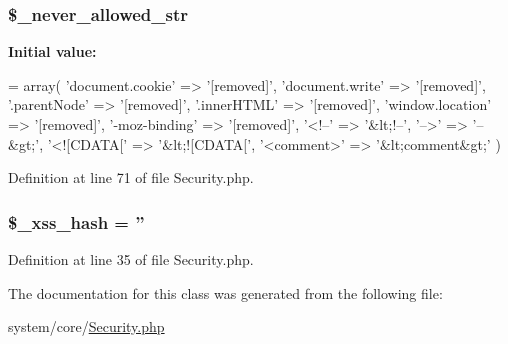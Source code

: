 \hypertarget{class_c_i___security_ab883fab930a1c4a926eaa501ab211823}{
\subsubsection[{\$\-\_\-never\-\_\-allowed\-\_\-str}]{\setlength{\rightskip}{0pt plus 5cm}\$\-\_\-never\-\_\-allowed\-\_\-str\hspace{0.3cm}{\ttfamily [protected]}}}\label{class_c_i___security_ab883fab930a1c4a926eaa501ab211823}
{\bfseries Initial value\-:}
\begin{DoxyCode}
= array(
        \textcolor{stringliteral}{'document.cookie'}   => \textcolor{stringliteral}{'[removed]'},
        \textcolor{stringliteral}{'document.write'}    => \textcolor{stringliteral}{'[removed]'},
        \textcolor{stringliteral}{'.parentNode'}       => \textcolor{stringliteral}{'[removed]'},
        \textcolor{stringliteral}{'.innerHTML'}        => \textcolor{stringliteral}{'[removed]'},
        \textcolor{stringliteral}{'window.location'}   => \textcolor{stringliteral}{'[removed]'},
        \textcolor{stringliteral}{'-moz-binding'}      => \textcolor{stringliteral}{'[removed]'},
        \textcolor{stringliteral}{'<!--'}              => \textcolor{stringliteral}{'&lt;!--'},
        \textcolor{stringliteral}{'-->'}               => \textcolor{stringliteral}{'--&gt;'},
        \textcolor{stringliteral}{'<![CDATA['}         => \textcolor{stringliteral}{'&lt;![CDATA['},
        \textcolor{stringliteral}{'<comment>'}         => \textcolor{stringliteral}{'&lt;comment&gt;'}
    )
\end{DoxyCode}


Definition at line 71 of file Security.\-php.

\hypertarget{class_c_i___security_aca426a0e87199bfa36c7401a1d06a419}{
\subsubsection[{\$\-\_\-xss\-\_\-hash}]{\setlength{\rightskip}{0pt plus 5cm}\$\-\_\-xss\-\_\-hash = ''\hspace{0.3cm}{\ttfamily [protected]}}}\label{class_c_i___security_aca426a0e87199bfa36c7401a1d06a419}


Definition at line 35 of file Security.\-php.



The documentation for this class was generated from the following file\-:\begin{DoxyCompactItemize}
\item 
system/core/\hyperlink{_security_8php}{Security.\-php}\end{DoxyCompactItemize}
